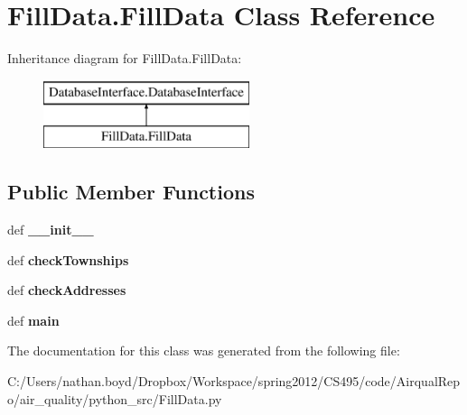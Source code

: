 \hypertarget{class_fill_data_1_1_fill_data}{\section{Fill\-Data.\-Fill\-Data Class Reference}
\label{class_fill_data_1_1_fill_data}
}
Inheritance diagram for Fill\-Data.\-Fill\-Data\-:\begin{figure}[H]
\begin{center}
\leavevmode
\includegraphics[height=2.000000cm]{class_fill_data_1_1_fill_data}
\end{center}
\end{figure}
\subsection*{Public Member Functions}
\begin{DoxyCompactItemize}
\item 
\hypertarget{class_fill_data_1_1_fill_data_af740b6816f2b16d11688251cbd0eefff}{def {\bfseries \-\_\-\-\_\-init\-\_\-\-\_\-}}\label{class_fill_data_1_1_fill_data_af740b6816f2b16d11688251cbd0eefff}

\item 
\hypertarget{class_fill_data_1_1_fill_data_acce1c8c84567e2e1cf45e0160d80006e}{def {\bfseries check\-Townships}}\label{class_fill_data_1_1_fill_data_acce1c8c84567e2e1cf45e0160d80006e}

\item 
\hypertarget{class_fill_data_1_1_fill_data_af9c92e35e375bed232be9bec5bce5ad0}{def {\bfseries check\-Addresses}}\label{class_fill_data_1_1_fill_data_af9c92e35e375bed232be9bec5bce5ad0}

\item 
\hypertarget{class_fill_data_1_1_fill_data_a8a24290464e37b6f668338c7b75dab69}{def {\bfseries main}}\label{class_fill_data_1_1_fill_data_a8a24290464e37b6f668338c7b75dab69}

\end{DoxyCompactItemize}


The documentation for this class was generated from the following file\-:\begin{DoxyCompactItemize}
\item 
C\-:/\-Users/nathan.\-boyd/\-Dropbox/\-Workspace/spring2012/\-C\-S495/code/\-Airqual\-Repo/air\-\_\-quality/python\-\_\-src/Fill\-Data.\-py\end{DoxyCompactItemize}
